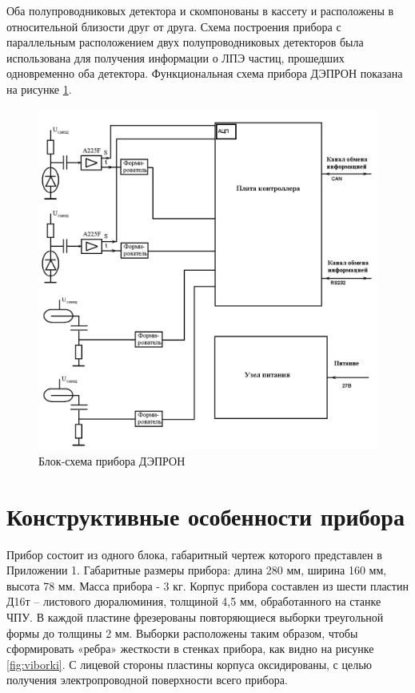 Оба полупроводниковых детектора и скомпонованы в кассету и расположены в относительной близости друг от друга. Схема построения прибора с параллельным расположением двух полупроводниковых детекторов была использована для получения информации о ЛПЭ частиц, прошедших одновременно оба детектора. Функциональная схема прибора ДЭПРОН показана на рисунке \ref{fig:Depron_blocksch}.
 
\begin{figure}
\centering
\includegraphics[width=0.8\linewidth]{images/Depron_blocksch}
\caption{Блок-схема прибора ДЭПРОН}
\label{fig:Depron_blocksch}
\end{figure}


\section{Конструктивные особенности прибора}

Прибор состоит из одного блока, габаритный чертеж которого представлен в Приложении 1. Габаритные размеры прибора: длина  280 мм, ширина 160 мм, высота 78 мм. Масса прибора - 3 кг. Корпус прибора составлен из шести пластин Д16т -- листового дюралюминия, толщиной 4,5 мм, обработанного на станке ЧПУ. В каждой пластине фрезерованы повторяющиеся выборки треугольной формы до толщины 2 мм. Выборки расположены таким образом, чтобы сформировать «ребра» жесткости в стенках прибора, как видно на рисунке \ref{fig:viborki}. С лицевой стороны пластины корпуса оксидированы, с целью получения электропроводной поверхности всего прибора.

